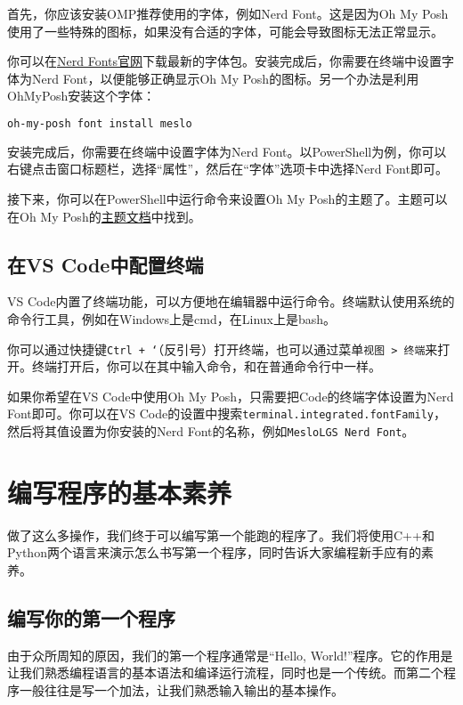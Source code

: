 \documentclass[../main.tex]{subfiles}
\begin{document}
首先，你应该安装OMP推荐使用的字体，例如Nerd Font。这是因为Oh My Posh使用了一些特殊的图标，如果没有合适的字体，可能会导致图标无法正常显示。

你可以在\href{https://www.nerdfonts.com/}{Nerd Fonts官网}下载最新的字体包。安装完成后，你需要在终端中设置字体为Nerd Font，以便能够正确显示Oh My Posh的图标。另一个办法是利用OhMyPosh安装这个字体：
\begin{lstlisting}[language=bash]
  oh-my-posh font install meslo
\end{lstlisting}

安装完成后，你需要在终端中设置字体为Nerd Font。以PowerShell为例，你可以右键点击窗口标题栏，选择“属性”，然后在“字体”选项卡中选择Nerd Font即可。

接下来，你可以在PowerShell中运行命令来设置Oh My Posh的主题了。主题可以在Oh My Posh的\href{https://ohmyposh.dev/docs/themes}{主题文档}中找到。 

\subsection{在VS Code中配置终端}

VS Code内置了终端功能，可以方便地在编辑器中运行命令。终端默认使用系统的命令行工具，例如在Windows上是cmd，在Linux上是bash。

你可以通过快捷键\texttt{Ctrl + `}（反引号）打开终端，也可以通过菜单\texttt{视图 > 终端}来打开。终端打开后，你可以在其中输入命令，和在普通命令行中一样。

如果你希望在VS Code中使用Oh My Posh，只需要把Code的终端字体设置为Nerd Font即可。你可以在VS Code的设置中搜索\texttt{terminal.integrated.fontFamily}，然后将其值设置为你安装的Nerd Font的名称，例如\texttt{MesloLGS Nerd Font}。

\section{编写程序的基本素养}

做了这么多操作，我们终于可以编写第一个能跑的程序了。我们将使用C++和Python两个语言来演示怎么书写第一个程序，同时告诉大家编程新手应有的素养。

\subsection{编写你的第一个程序}

由于众所周知的原因，我们的第一个程序通常是“Hello, World!”程序。它的作用是让我们熟悉编程语言的基本语法和编译运行流程，同时也是一个传统。而第二个程序一般往往是写一个加法，让我们熟悉输入输出的基本操作。
\end{document}
